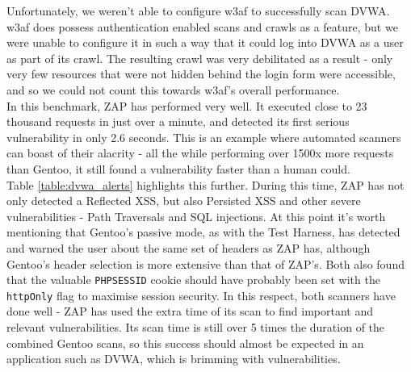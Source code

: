  Unfortunately, we weren't able to configure w3af to successfully scan DVWA. w3af does possess authentication enabled scans and crawls as a feature, but we were unable to configure it in such a way that it could log into DVWA as a user as part of its crawl. The resulting crawl was very debilitated as a result - only very few resources that were not hidden behind the login form were accessible, and so we could not count this towards w3af's overall performance. \\
 
 In this benchmark, ZAP has performed very well. It executed close to 23 thousand requests in just over a minute, and detected its first serious vulnerability in only 2.6 seconds. This is an example where automated scanners can boast of their alacrity - all the while performing over 1500x more requests than Gentoo, it still found a vulnerability faster than a human could. \\

Table \ref{table:dvwa_alerts} highlights this further. During this time, ZAP has not only detected a Reflected XSS, but also Persisted XSS and other severe vulnerabilities - Path Traversals and SQL injections. At this point it's worth mentioning that Gentoo's passive mode, as with the Test Harness, has detected and warned the user about the same set of headers as ZAP has, although Gentoo's header selection is more extensive than that of ZAP's. Both also found that the valuable \texttt{PHPSESSID} cookie should have probably been set with the \texttt{httpOnly} flag to maximise session security. In this respect, both scanners have done well - ZAP has used the extra time of its scan to find important and relevant vulnerabilities. Its scan time is still over 5 times the duration of the combined Gentoo scans, so this success should almost be expected in an application such as DVWA, which is brimming with vulnerabilities.



